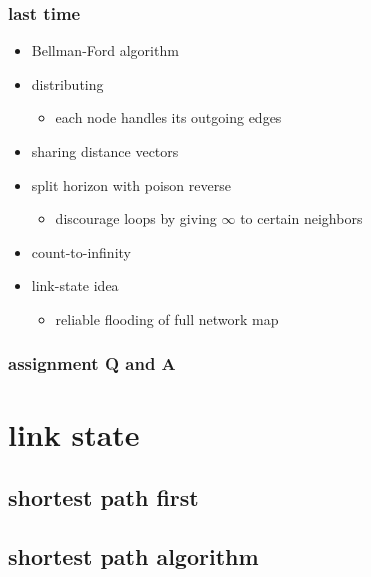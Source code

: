 \date{}
\title{}
\date{}

\begin{frame}
    \titlepage
\end{frame}

\begin{frame}
\frametitle{last time}
\begin{itemize}
    \item Bellman-Ford algorithm
    \item distributing 
        \begin{itemize}
        \item each node handles its outgoing edges
        \end{itemize}
    \item sharing distance vectors
    \item split horizon with poison reverse
        \begin{itemize}
        \item discourage loops by giving $\infty$ to certain neighbors
        \end{itemize}
    \item count-to-infinity
    \item link-state idea
        \begin{itemize}
        \item reliable flooding of full network map
        \end{itemize}
\end{itemize}
\end{frame}



\begin{frame}
\frametitle{assignment Q and A}
\end{frame}

\usetikzlibrary{matrix}

\section{link state}
\subsection{shortest path first}



\subsection{shortest path algorithm}


